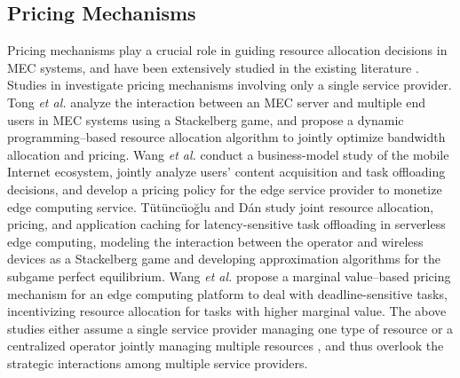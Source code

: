 \documentclass[lettersize,journal]{IEEEtran}
\newcommand{\etal}{\textit{et al.}}
\begin{document}
\subsection{Pricing Mechanisms}
Pricing mechanisms play a crucial role in guiding resource allocation decisions in MEC systems, and have been extensively studied in the existing literature \cite{chen2024price,tong2024stackelberg,wang2022monetizing,ding2023optimal,tutuncuoglu2024joint,wang2022profit,liu2022resource,wang2023marginal}.
Studies in \cite{tong2024stackelberg,tutuncuoglu2024joint,wang2022monetizing,wang2023marginal} investigate pricing mechanisms involving only a single service provider. 
Tong \etal \cite{tong2024stackelberg} analyze the interaction between an MEC server and multiple end users in MEC systems using a Stackelberg game, and propose a dynamic programming–based resource allocation algorithm to jointly optimize bandwidth allocation and pricing.
Wang \etal \cite{wang2022monetizing} conduct a business-model study of the mobile Internet ecosystem, jointly analyze users’ content acquisition and task offloading decisions, and develop a pricing policy for the edge service provider to monetize edge computing service.
Tütüncüoğlu and Dán \cite{tutuncuoglu2024joint} study joint resource allocation, pricing, and application caching for latency-sensitive task offloading in serverless edge computing, modeling the interaction between the operator and wireless devices as a Stackelberg game and developing approximation algorithms for the subgame perfect equilibrium.
Wang \etal \cite{wang2023marginal} propose a marginal value–based pricing mechanism for an edge computing platform to deal with deadline-sensitive tasks, incentivizing resource allocation for tasks with higher marginal value.
The above studies either assume a single service provider managing one type of resource \cite{tong2024stackelberg,wang2022monetizing} or a centralized operator jointly managing multiple resources \cite{wang2023marginal,tutuncuoglu2024joint}, and thus overlook the strategic interactions among multiple service providers.
\end{document}
